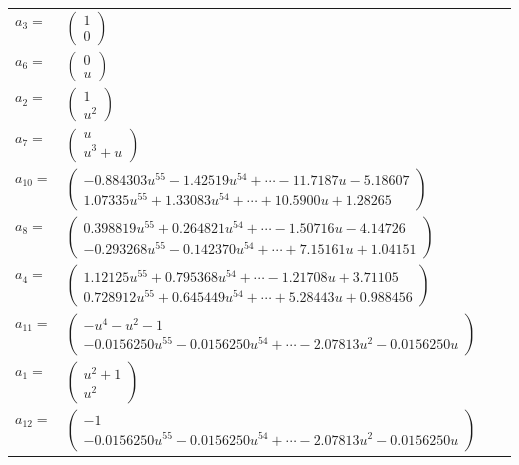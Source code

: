 \documentclass[1p]{elsarticle_modified}
\theoremstyle{definition}
\begin{document}
\begin{tabular}{m{7pt} m{180pt} m{7pt} m{180pt} }
\flushright $a_{3}=$&$\begin{pmatrix}1\\0\end{pmatrix}$ \\
\flushright $a_{6}=$&$\begin{pmatrix}0\\u\end{pmatrix}$ \\
\flushright $a_{2}=$&$\begin{pmatrix}1\\u^2\end{pmatrix}$ \\
\flushright $a_{7}=$&$\begin{pmatrix}u\\u^3+u\end{pmatrix}$ \\
\flushright $a_{10}=$&$\begin{pmatrix}-0.884303 u^{55}-1.42519 u^{54}+\cdots-11.7187 u-5.18607\\1.07335 u^{55}+1.33083 u^{54}+\cdots+10.5900 u+1.28265\end{pmatrix}$ \\
\flushright $a_{8}=$&$\begin{pmatrix}0.398819 u^{55}+0.264821 u^{54}+\cdots-1.50716 u-4.14726\\-0.293268 u^{55}-0.142370 u^{54}+\cdots+7.15161 u+1.04151\end{pmatrix}$ \\
\flushright $a_{4}=$&$\begin{pmatrix}1.12125 u^{55}+0.795368 u^{54}+\cdots-1.21708 u+3.71105\\0.728912 u^{55}+0.645449 u^{54}+\cdots+5.28443 u+0.988456\end{pmatrix}$ \\
\flushright $a_{11}=$&$\begin{pmatrix}- u^4- u^2-1\\-0.0156250 u^{55}-0.0156250 u^{54}+\cdots-2.07813 u^{2}-0.0156250 u\end{pmatrix}$ \\
\flushright $a_{1}=$&$\begin{pmatrix}u^2+1\\u^2\end{pmatrix}$ \\
\flushright $a_{12}=$&$\begin{pmatrix}-1\\-0.0156250 u^{55}-0.0156250 u^{54}+\cdots-2.07813 u^{2}-0.0156250 u\end{pmatrix}$ \\

\end{tabular}
\end{document}
